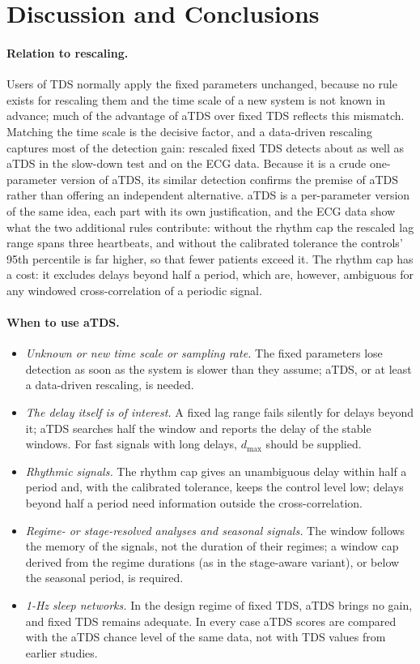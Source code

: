 \documentclass[11pt,a4paper]{article}
\begin{document}
\section{Discussion and Conclusions}
\label{sec:conclusion}

\paragraph{Relation to rescaling.} Users of TDS normally apply the fixed parameters unchanged, because no rule exists for rescaling them and the time scale of a new system is not known in advance; much of the advantage of aTDS over fixed TDS reflects this mismatch. Matching the time scale is the decisive factor, and a data-driven rescaling captures most of the detection gain: rescaled fixed TDS detects about as well as aTDS in the slow-down test and on the ECG data. Because it is a crude one-parameter version of aTDS, its similar detection confirms the premise of aTDS rather than offering an independent alternative. aTDS is a per-parameter version of the same idea, each part with its own justification, and the ECG data show what the two additional rules contribute: without the rhythm cap the rescaled lag range spans three heartbeats, and without the calibrated tolerance the controls' 95th percentile is far higher, so that fewer patients exceed it. The rhythm cap has a cost: it excludes delays beyond half a period, which are, however, ambiguous for any windowed cross-correlation of a periodic signal.

\paragraph{When to use aTDS.}
\begin{itemize}
\setlength{\itemsep}{1pt}
\item \emph{Unknown or new time scale or sampling rate.} The fixed parameters lose detection as soon as the system is slower than they assume; aTDS, or at least a data-driven rescaling, is needed.
\item \emph{The delay itself is of interest.} A fixed lag range fails silently for delays beyond it; aTDS searches half the window and reports the delay of the stable windows. For fast signals with long delays, $d_{\max}$ should be supplied.
\item \emph{Rhythmic signals.} The rhythm cap gives an unambiguous delay within half a period and, with the calibrated tolerance, keeps the control level low; delays beyond half a period need information outside the cross-correlation.
\item \emph{Regime- or stage-resolved analyses and seasonal signals.} The window follows the memory of the signals, not the duration of their regimes; a window cap derived from the regime durations (as in the stage-aware variant), or below the seasonal period, is required.
\item \emph{1-Hz sleep networks.} In the design regime of fixed TDS, aTDS brings no gain, and fixed TDS remains adequate. In every case aTDS scores are compared with the aTDS chance level of the same data, not with TDS values from earlier studies.
\end{itemize}
\end{document}
